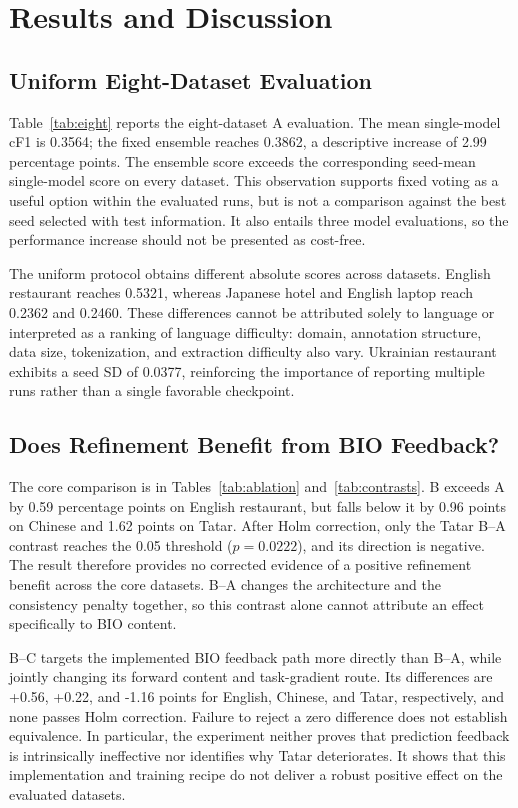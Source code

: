 \documentclass[conference]{IEEEtran}
\begin{document}
\section{Results and Discussion}
\subsection{Uniform Eight-Dataset Evaluation}

Table~\ref{tab:eight} reports the eight-dataset A evaluation. The mean single-model cF1 is 0.3564; the fixed ensemble reaches 0.3862, a descriptive increase of 2.99 percentage points. The ensemble score exceeds the corresponding seed-mean single-model score on every dataset. This observation supports fixed voting as a useful option within the evaluated runs, but is not a comparison against the best seed selected with test information. It also entails three model evaluations, so the performance increase should not be presented as cost-free.

The uniform protocol obtains different absolute scores across datasets. English restaurant reaches 0.5321, whereas Japanese hotel and English laptop reach 0.2362 and 0.2460. These differences cannot be attributed solely to language or interpreted as a ranking of language difficulty: domain, annotation structure, data size, tokenization, and extraction difficulty also vary. Ukrainian restaurant exhibits a seed SD of 0.0377, reinforcing the importance of reporting multiple runs rather than a single favorable checkpoint.

\subsection{Does Refinement Benefit from BIO Feedback?}


The core comparison is in Tables~\ref{tab:ablation} and~\ref{tab:contrasts}. B exceeds A by 0.59 percentage points on English restaurant, but falls below it by 0.96 points on Chinese and 1.62 points on Tatar. After Holm correction, only the Tatar B--A contrast reaches the 0.05 threshold ($p=0.0222$), and its direction is negative. The result therefore provides no corrected evidence of a positive refinement benefit across the core datasets. B--A changes the architecture and the consistency penalty together, so this contrast alone cannot attribute an effect specifically to BIO content.

B--C targets the implemented BIO feedback path more directly than B--A, while jointly changing its forward content and task-gradient route. Its differences are +0.56, +0.22, and -1.16 points for English, Chinese, and Tatar, respectively, and none passes Holm correction. Failure to reject a zero difference does not establish equivalence. In particular, the experiment neither proves that prediction feedback is intrinsically ineffective nor identifies why Tatar deteriorates. It shows that this implementation and training recipe do not deliver a robust positive effect on the evaluated datasets.
\end{document}
